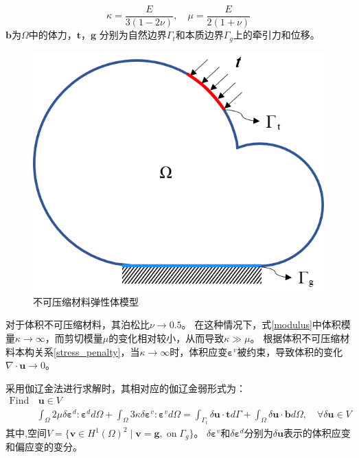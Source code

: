 \begin{equation}\label{modulus}
    \kappa = \frac{E}{3(1-2\nu)}, \quad \mu = \frac{E}{2(1+\nu)}
\end{equation}
$\boldsymbol b$为$\Omega$中的体力，$\boldsymbol t$，$\boldsymbol g$ 分别为自然边界$\Gamma_t$和本质边界$\Gamma_g$上的牵引力和位移。
\begin{figure}[!h]
    \centering 
        \includegraphics[scale=0.6]{figures/model.png}
        \caption{不可压缩材料弹性体模型}\label{model}
\end{figure}

对于体积不可压缩材料，其泊松比$\nu \rightarrow 0.5$。 在这种情况下，式\eqref{modulus}中体积模量$\kappa \rightarrow \infty$，而剪切模量$\mu$的变化相对较小，从而导致$\kappa\gg\mu$。
根据体积不可压缩材料本构关系\eqref{stress_penalty}，当$\kappa \rightarrow \infty$时，体积应变$\boldsymbol \varepsilon^v$被约束，导致体积的变化$\nabla \cdot \boldsymbol u\rightarrow 0$。

采用伽辽金法进行求解时，其相对应的伽辽金弱形式为：
\begin{equation}\label{weak_penalty}
    \begin{split}
        \text{Find}&\,\boldsymbol u \in V\\
        &\int_\Omega 2\mu \delta \boldsymbol \varepsilon^d : \boldsymbol \varepsilon^d d\Omega +
        \int_\Omega 3\kappa \delta \boldsymbol \varepsilon^v : \boldsymbol \varepsilon^v d\Omega =
        \int_{\Gamma_t} \delta \boldsymbol u \cdot \boldsymbol t d\Gamma + \int_\Omega \delta \boldsymbol          u \cdot \boldsymbol b d\Omega, \quad
        \forall \delta \boldsymbol u \in V
    \end{split}
\end{equation}
其中,空间$V=\{\boldsymbol v \in H^1(\Omega)^2\;\vert\;\boldsymbol v = \boldsymbol g, \; \textrm{on} \; \Gamma_g\}$。
$\delta\boldsymbol \varepsilon^v$和$\delta\boldsymbol \varepsilon^d $分别为$\delta \boldsymbol u$表示的体积应变和偏应变的变分。


